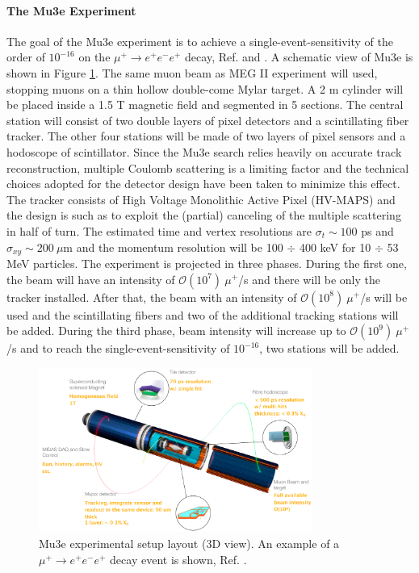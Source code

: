 \paragraph{The Mu3e Experiment}
The goal of the Mu3e experiment is to achieve a single-event-sensitivity of the order
of $10^{-16}$ on the $\mu^+ \rightarrow e^+ e^-  e^+ $ decay, Ref. \cite{hesketh2022mu3e} and \cite{papa}. 
A schematic view of Mu3e is shown in Figure \ref{fig:mu3e}.
The same muon beam as MEG II experiment will used, stopping muons on a thin hollow double-come Mylar target. 
A 2 m cylinder will be placed inside a 1.5 T magnetic field and segmented in 5 sections. 
The central station will consist of two double layers of pixel detectors and a
scintillating fiber tracker. The other four stations will be made of two layers of pixel
sensors and a hodoscope of scintillator. Since the Mu3e search relies heavily on accurate track reconstruction, multiple Coulomb
scattering is a limiting factor and the technical choices adopted for the detector design
have been taken to minimize this effect. The tracker consists of High Voltage Monolithic
Active Pixel (HV-MAPS) and the design is such as to exploit the (partial) canceling of
the multiple scattering in half of turn. The estimated time and vertex resolutions are
$\sigma_t \sim 100$ ps and $\sigma_{xy} \sim 200 \ \mu$m and the momentum resolution will be 100 $\div$ 400 keV for 10 $\div$ 53
MeV particles. The experiment is projected in three phases. During the first one, the beam will have an intensity of $\mathcal{O}(10^7) \ \mu^+$/s 
and there will be only the tracker installed. After that, the beam with an intensity of $\mathcal{O}(10^8) \ \mu^+$/s will 
be used and the scintillating fibers and two of the additional tracking stations will be added.
During the third phase, beam intensity will increase up to $\mathcal{O}(10^9) \ \mu^+$/s and to 
reach the single-event-sensitivity of $10^{-16}$, two stations will be added.
\begin{figure}[!h]
\centering
\includegraphics[width =0.8\textwidth]{figures/png/Screenshot_20240321_143650}
\caption{Mu3e experimental setup layout (3D view). An example of a $\mu^+ \rightarrow e^+ e^-  e^+ $ decay event is shown, Ref. \cite{papa}.}
\label{fig:mu3e}
\end{figure}









